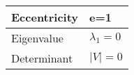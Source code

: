 \begin{table}[H]
    \centering
    \begin{tabular}{|l|l|}
    \hline
      Eccentricity   & e=1 \\
      \hline
      Eigenvalue   & $\lambda_1=0$ \\
      \hline
      Determinant   & $\vert V\vert =0$ \\
      \hline
    \end{tabular}
    \label{tab:tables/table.tex}
\end{table}